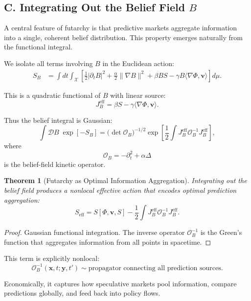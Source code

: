 \documentclass[12pt]{article}
\newtheorem{theorem}{Theorem}
\begin{document}
\subsection*{C. Integrating Out the Belief Field $B$}

A central feature of futarchy is that predictive markets aggregate
information into a single, coherent belief distribution. This property
emerges naturally from the functional integral.

We isolate all terms involving $B$ in the Euclidean action:
\begin{align}
S_B
&=
\int dt \int_{\mathcal{X}}
\left[
\frac{1}{2}|\partial_t B|^2
+ \frac{\alpha}{2}\|\nabla B\|^2
+ \beta B S
- \gamma B \langle \nabla \Phi,\mathbf{v}\rangle
\right] d\mu.
\end{align}

This is a quadratic functional of $B$ with linear source:
\[
J_B^{\text{eff}}
=
\beta S
- \gamma \langle \nabla \Phi,\mathbf{v} \rangle.
\]

Thus the belief integral is Gaussian:
\begin{equation}
\int \mathcal{D}B\;
\exp\!\left[ -S_B\right]
=
\big(\det \mathcal{O}_B\big)^{-1/2}
\exp\!\left[
    \frac{1}{2}
    \int J_B^{\text{eff}}
    \mathcal{O}_B^{-1}
    J_B^{\text{eff}}
\right],
\end{equation}
where
\[
\mathcal{O}_B
=
- \partial_t^2
+ \alpha \Delta
\]
is the belief-field kinetic operator.

\begin{theorem}[Futarchy as Optimal Information Aggregation]
Integrating out the belief field produces a nonlocal effective action
that encodes optimal prediction aggregation:
\[
S_{\text{eff}}
= S[\Phi,\mathbf{v},S]
- \frac{1}{2}
    \int
    J_B^{\text{eff}}
    \mathcal{O}_B^{-1}
    J_B^{\text{eff}}.
\]
\end{theorem}

\begin{proof}
Gaussian functional integration. The inverse operator $\mathcal{O}_B^{-1}$
is the Green’s function that aggregates information from all points in
spacetime.
\end{proof}

This term is explicitly nonlocal:
\[
\mathcal{O}_B^{-1}(\mathbf{x},t;\mathbf{y},t')
\sim
\text{propagator connecting all prediction sources}.
\]

Economically, it captures how speculative markets pool information,
compare predictions globally, and feed back into policy flows.
\end{document}
